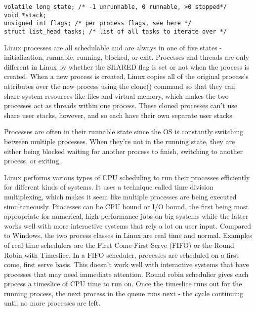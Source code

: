 \documentclass[10pt,draftclsnofoot,onecolumn,letterpaper]{IEEEtran}
\begin{document}
\begin{verbatim}
volatile long state; /* -1 unrunnable, 0 runnable, >0 stopped*/
void *stack;
unsigned int flags; /* per process flags, see here */
struct list_head tasks; /* list of all tasks to iterate over */
\end{verbatim}

Linux processes are all schedulable and are always in one of five states - initialization, runnable, running, blocked, or exit. Processes and threads are only different in Linux by whether the SHARED flag is set or not when the process is created\cite{1}. When a new process is created, Linux copies all of the original process's attributes over the new process using the clone() command so that they can share system resources like files and virtual memory, which makes the two processes act as threads within one process. These cloned processes can't use share user stacks, however, and so each have their own separate user stacks\cite{2}. \par
Processes are often in their runnable state since the OS is constantly switching between multiple processes. When they're not in the running state, they are either being blocked waiting for another process to finish, switching to another process, or exiting\cite{1}. \par
Linux performs various types of CPU scheduling to run their processes efficiently for different kinds of systems. It uses a technique called time division multiplexing, which makes it seem like multiple processes are being executed simultaneously. Processes can be CPU bound or I/O bound, the first being most appropriate for numerical, high performance jobs on big systems while the latter works well with more interactive systems that rely a lot on user input\cite{1}. Compared to Windows, the two process classes in Linux are real time and normal. Examples of real time schedulers are the First Come First Serve (FIFO) or the Round Robin with Timeslice. In a FIFO scheduler, processes are scheduled on a first come, first serve basis. This doesn't work well with interactive systems that have processes that may need immediate attention. Round robin schedulier gives each process a timeslice of CPU time to run on. Once the timeslice runs out for the running process, the next process in the queue runs next - the cycle continuing until no more processes are left\cite{1}. \par
\end{document}
